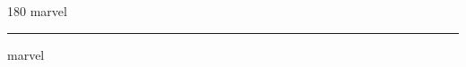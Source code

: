 
\begin{frame}
\begin{center}
\begin{turn}{180}
{\fontsize{2.5cm}{1em}\selectfont marvel}
\end{turn}
\vspace{1em}\par  
\hrule
\vspace{1em}\par  
{\fontsize{2.5cm}{1em}\selectfont marvel}
\end{center}
\end{frame}
